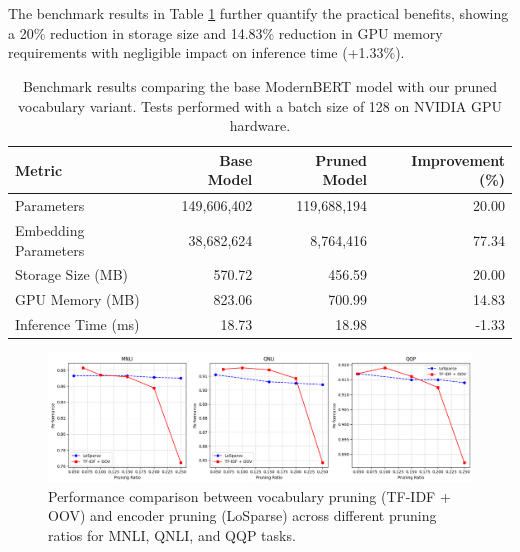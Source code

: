 \documentclass[twocolumn]{article}
\begin{document}
\\ \\
The benchmark results in Table \ref{tab:benchmark_results} further quantify the practical benefits, showing a 20\% reduction in storage size and 14.83\% reduction in GPU memory requirements with negligible impact on inference time (+1.33\%).
\begin{table}[htb]
\centering
\scriptsize
\setlength{\tabcolsep}{5pt}
\begin{tabular}{lrrr}
\toprule
\textbf{Metric} & \textbf{Base Model} & \textbf{Pruned Model} & \textbf{Improvement (\%)} \\
\midrule
Parameters & 149,606,402 & 119,688,194 & 20.00 \\
Embedding Parameters & 38,682,624 & 8,764,416 & 77.34 \\
Storage Size (MB) & 570.72 & 456.59 & 20.00 \\
GPU Memory (MB) & 823.06 & 700.99 & 14.83 \\
Inference Time (ms) & 18.73 & 18.98 & -1.33 \\
\bottomrule
\end{tabular}
\caption{Benchmark results comparing the base ModernBERT model with our pruned vocabulary variant. Tests performed with a batch size of 128 on NVIDIA GPU hardware.}
\label{tab:benchmark_results}
\end{table}

\begin{figure}[t]
    \centering
    \includegraphics[width=\linewidth]{images/pruning_ratios.png}
    \caption{Performance comparison between vocabulary pruning (TF-IDF + OOV) and encoder pruning (LoSparse) across different pruning ratios for MNLI, QNLI, and QQP tasks. }
    \label{fig:pruning_ratio}
\end{figure}
\end{document}
